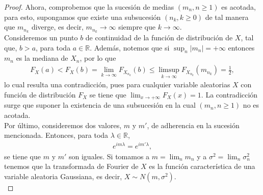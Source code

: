 \begin{proof}
Ahora, comprobemos que la sucesión de medias $(m_n, n \geq 1)$ es acotada, para esto, supongamos que existe una subsucesión $(n_k, k \geq 0)$ de tal manera que $m_{n_k}$ diverge, es decir, $m_{n_k} \rightarrow \infty$ siempre que $k \rightarrow \infty$. \\ 

Consideremos un punto $b$ de continuidad de la función de distribución de $X$, tal que, $b > a$, para toda $a \in \mathbb{R}$. Además, notemos que si $\sup_n |m_n| = + \infty$ entonces $m_n$ es la mediana de $X_n$, por lo que 
	\begin{align*}
	F_X (a) < F_X (b) = \lim_{k \rightarrow \infty} F_{X_{n_k}} (b) \leq \limsup_{k \rightarrow \infty} F_{X_{n_k}} (m_{n_k}) = \frac{1}{2}, 
	\end{align*}
lo cual resulta una contradicción, pues para cualquier variable aleatorias $X$ con función de distribución $F_X$ se tiene que $\lim_{x \rightarrow + \infty} F_X (x) = 1$. La contradicción surge que suponer la existencia de una subsucesión en la cual $(m_n, n \geq 1)$ no es acotada. \\

Por último, consideremos dos valores, $m$ y $m'$, de adherencia en la sucesión mencionada. Entonces, para toda $\lambda \in \mathbb{R}$, 
	\begin{align*}
	e^{i m \lambda} = e^{i m' \lambda},
	\end{align*}
se tiene que $m$ y $m'$ son iguales. Si tomamos a $m = \lim_n m_n$ y a $\sigma^2 = \lim_n \sigma_n^2$ tenemos que la transformada de Fourier de $X$ es la función característica de una variable aleatoria Gaussiana, es decir, $X \sim N(m, \sigma^2)$. \\


\end{proof}
